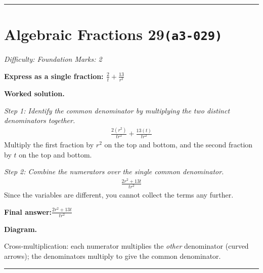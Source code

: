 \documentclass[11pt]{article}
\newcommand{\question}[1]{\par\medskip\noindent\textbf{#1}\par}
\begin{document}
\medskip\hrule

\section*{Algebraic Fractions 29\quad\small\texttt{(a3-029)}}
\textit{Difficulty: Foundation \quad\textbar\quad Marks: 2}

\question{Express as a single fraction: \( \frac{2}{t} + \frac{13}{r^2} \)}

\textbf{Worked solution.}

\textit{Step 1: Identify the common denominator by multiplying the two distinct denominators together.}
\[\begin{gathered}
\frac{2(r^2)}{tr^2} + \frac{13(t)}{tr^2}
\end{gathered}\]
Multiply the first fraction by \( r^2 \) on the top and bottom, and the second fraction by \( t \) on the top and bottom.

\textit{Step 2: Combine the numerators over the single common denominator.}
\[\begin{gathered}
\frac{2r^2 + 13t}{tr^2}
\end{gathered}\]
Since the variables are different, you cannot collect the terms any further.

\begin{answerbox}
\textbf{Final answer:}\quad \(\displaystyle \frac{2r^2 + 13t}{tr^2}\)
\end{answerbox}
\textbf{Diagram.}

\begin{center}
\end{center}
\small Cross-multiplication: each numerator multiplies the \emph{other} denominator (curved arrows); the denominators multiply to give the common denominator.\normalsize

\medskip\hrule
\end{document}
